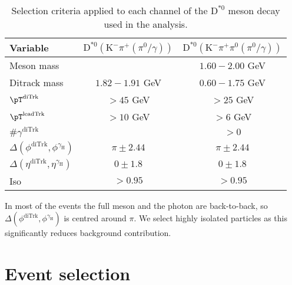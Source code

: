 \begin{table}[!ht]
    \centering
    \begin{tabular}{|l|c|c|}
        \hline
        \cellcolor{lightgray}Variable & \cellcolor{lightgray}$\text{D}^{*0}(\text{K}^{-}\pi^{+}{\scriptstyle(\pi^{0}/\gamma)})$ & \cellcolor{lightgray}$\text{D}^{*0}(\text{K}^{-}\pi^{+}\pi^{0}{\scriptstyle(\pi^{0}/\gamma)})$ \\ \hline
        Meson mass                                              &                   &$1.60-2.00$ GeV  \\
        Ditrack mass                                            &$1.82-1.91$ GeV    &$0.60-1.75$ GeV  \\
        $\pT^{\text{diTrk}}$                                    &$>45$ GeV          &$>25$ GeV           \\
        $\pT^{\text{leadTrk}}$                               &$>10$ GeV          &$>6$ GeV           \\
        $\#\gamma^{\text{diTrk}}$                               &                   &$>0$               \\
        $\Delta(\phi^{\text{diTrk}}, \phi^{\gamma_\text{H}})$   &$\pi\pm2.44$       &$\pi\pm2.44$        \\
        $\Delta(\eta^{\text{diTrk}}, \eta^{\gamma_\text{H}})$   &$0\pm1.8$          &$0\pm1.8$           \\
        Iso                                                     &$>0.95$            &$>0.95$             \\
        \hline
        \end{tabular}
    \caption{Selection criteria applied to each channel of the $\text{D}^{*0}$ meson decay used in the analysis.}
    \label{tab:meson_selection_2}
\end{table}

In most of the events the full meson and the photon are back-to-back, so $\Delta(\phi^{\text{diTrk}}, \phi^{\gamma_\text{H}})$ is centred around $\pi$. We select highly isolated particles as this significantly reduces background contribution.

\section{Event selection}\label{sec:event_selection}

